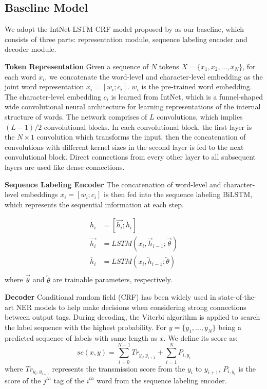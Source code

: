 \documentclass[letterpaper]{article} \usepackage{aaai20}  \usepackage{times}  \usepackage{helvet} \usepackage{courier}  \usepackage[hyphens]{url}  \usepackage{graphicx} \urlstyle{rm} \def\UrlFont{\rm}  \usepackage{graphicx}  \frenchspacing  \setlength{\pdfpagewidth}{8.5in}  \setlength{\pdfpageheight}{11in}
\begin{document}
\subsection{Baseline Model}
We adopt the IntNet-LSTM-CRF model proposed by \cite{xin2018learning} as our baseline, which consists of three parts: representation module, sequence labeling encoder and decoder module.

\noindent\textbf{Token Representation}
Given a sequence of $N$ tokens $X= \{x_1, x_2, ..., x_N\}$, for each word $x_i$, we concatenate the word-level and character-level embedding as the joint word representation $x_i = [w_i; c_i]$. $w_i$ is the pre-trained word embedding. The character-level embedding $c_i$ is learned from IntNet, which
is a funnel-shaped wide convolutional neural architecture for learning representations of the internal structure of words. The network comprises of $L$ convolutions,  which implies $(L - 1) /2$ convolutional blocks. In each convolutional block, the first layer is the $N \times 1$ convolution which transforms the input, then the concatenation of convolutions with different kernel sizes in the second layer is fed to the next convolutional block. Direct connections from every other layer to all subsequent layers are used like dense connections. 

\noindent\textbf{Sequence Labeling Encoder}
The concatenation of word-level and character-level embeddings $x_i = [w_i; c_i]$  is then fed into the sequence labeling BiLSTM, which represents the sequential information at each step.

\begin{equation}
    \begin{aligned}
        h_i &= [\overrightarrow{h_i};\overleftarrow{h_i}] \\
        \overrightarrow{h_i} &= LSTM(x_i, \overrightarrow{h}_{i-1}; \overrightarrow{\theta}) \\
        \overleftarrow{h_i} &= LSTM(x_i, \overleftarrow{h}_{i-1}; \overleftarrow{\theta}) \\
    \end{aligned}
\end{equation}
where $\overrightarrow{\theta}$ and $\overleftarrow{\theta}$ are trainable parameters, respectively. 

\noindent\textbf{Decoder}
Conditional random field (CRF) \cite{Lafferty:01} has been widely used in state-of-the-art NER models \cite{lample2016neural,ma2016end} to help make decisions when considering strong connections between output tags.
During decoding, the Viterbi algorithm is applied to search the label sequence with the highest probability.
For $y=\{y_1,...,y_N\}$ being a predicted sequence of labels with same length as $x$. We define its score as:
\begin{equation}  
sc(x, y) = \sum_{i=0}^{N-1} Tr_{y_i, y_{i+1}} + \sum_{i=1}^{N} P_{i, y_i}
\end{equation}
where $Tr_{y_i, y_{i+1}}$ represents the transmission score  from the $y_i$ to $y_{i+1}$,
$ P_{i, y_i}$  is the score of the $j^{th}$ tag of the $i^{th}$ word from the sequence labeling encoder.
\end{document}
